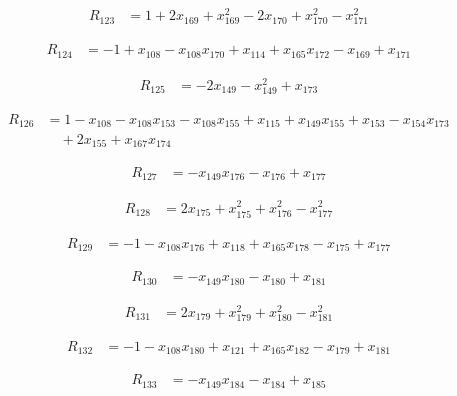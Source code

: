 \documentclass[11pt,letterpaper]{article}
\theoremstyle{definition}
\theoremstyle{remark}
\begin{document}
\begin{align*}
R_{123} &= 1 +2 x_{169} +x_{169}^{2} -2 x_{170} +x_{170}^{2} -x_{171}^{2}
\end{align*}

\begin{align*}
R_{124} &= -1 +x_{108} -x_{108} x_{170} +x_{114} +x_{165} x_{172} -x_{169} +x_{171}
\end{align*}

\begin{align*}
R_{125} &= -2 x_{149} -x_{149}^{2} +x_{173}
\end{align*}

\begin{align*}
R_{126} &= 1 -x_{108} -x_{108} x_{153} -x_{108} x_{155} +x_{115} +x_{149} x_{155} +x_{153} -x_{154} x_{173} \\
&\quad +2 x_{155} +x_{167} x_{174}
\end{align*}

\begin{align*}
R_{127} &= -x_{149} x_{176} -x_{176} +x_{177}
\end{align*}

\begin{align*}
R_{128} &= 2 x_{175} +x_{175}^{2} +x_{176}^{2} -x_{177}^{2}
\end{align*}

\begin{align*}
R_{129} &= -1 -x_{108} x_{176} +x_{118} +x_{165} x_{178} -x_{175} +x_{177}
\end{align*}

\begin{align*}
R_{130} &= -x_{149} x_{180} -x_{180} +x_{181}
\end{align*}

\begin{align*}
R_{131} &= 2 x_{179} +x_{179}^{2} +x_{180}^{2} -x_{181}^{2}
\end{align*}

\begin{align*}
R_{132} &= -1 -x_{108} x_{180} +x_{121} +x_{165} x_{182} -x_{179} +x_{181}
\end{align*}

\begin{align*}
R_{133} &= -x_{149} x_{184} -x_{184} +x_{185}
\end{align*}
\end{document}
